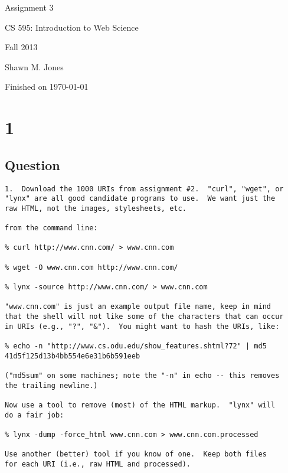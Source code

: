 \documentclass[letterpaper,11pt]{article}
\begin{document}
\begin{titlepage}

\begin{center}

\Huge{Assignment 3}

\Large{CS 595:  Introduction to Web Science}

\Large{Fall 2013}

\Large{Shawn M. Jones}

\Large Finished on \today

\end{center}

\end{titlepage}

\newpage
\section*{1}

\subsection*{Question}

\begin{verbatim}
1.  Download the 1000 URIs from assignment #2.  "curl", "wget", or
"lynx" are all good candidate programs to use.  We want just the
raw HTML, not the images, stylesheets, etc.

from the command line:

% curl http://www.cnn.com/ > www.cnn.com

% wget -O www.cnn.com http://www.cnn.com/

% lynx -source http://www.cnn.com/ > www.cnn.com

"www.cnn.com" is just an example output file name, keep in mind
that the shell will not like some of the characters that can occur
in URIs (e.g., "?", "&").  You might want to hash the URIs, like:

% echo -n "http://www.cs.odu.edu/show_features.shtml?72" | md5
41d5f125d13b4bb554e6e31b6b591eeb

("md5sum" on some machines; note the "-n" in echo -- this removes
the trailing newline.) 

Now use a tool to remove (most) of the HTML markup.  "lynx" will
do a fair job:

% lynx -dump -force_html www.cnn.com > www.cnn.com.processed

Use another (better) tool if you know of one.  Keep both files 
for each URI (i.e., raw HTML and processed). 
\end{verbatim}
\end{document}
